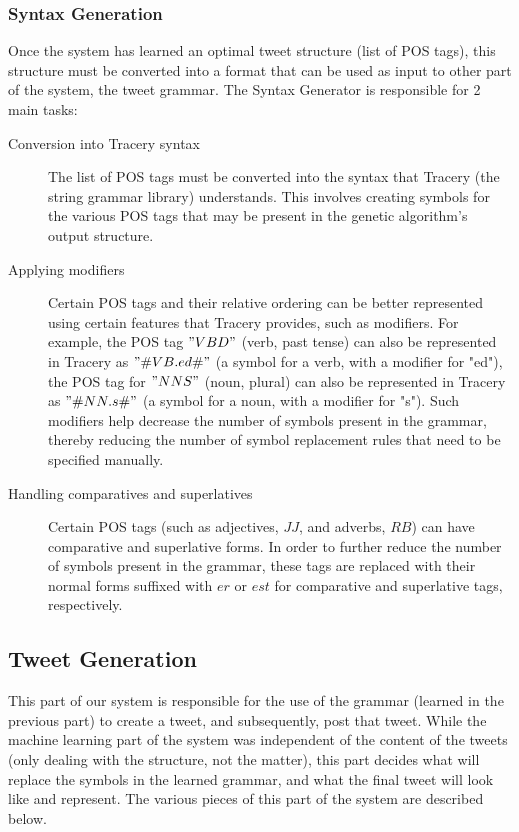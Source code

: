 \subsubsection{Syntax Generation}
Once the system has learned an optimal tweet structure (list of POS tags), this structure must be converted into a format that can be used as input to other part of the system, the tweet grammar. The Syntax Generator is responsible for 2 main tasks:
\begin{description}
\item [Conversion into Tracery syntax]
The list of POS tags must be converted into the syntax that Tracery (the string grammar library) understands. This involves creating symbols for the various POS tags that may be present in the genetic algorithm's output structure.
\item [Applying modifiers]
Certain POS tags and their relative ordering can be better represented using certain features that Tracery provides, such as modifiers. For example, the POS tag $"VBD"$ (verb, past tense) can also be represented in Tracery as $"\#VB.ed\#"$ (a symbol for a verb, with a modifier for "ed"), the POS tag for $"NNS"$ (noun, plural) can also be represented in Tracery as $"\#NN.s\#"$ (a symbol for a noun, with a modifier for "s"). Such modifiers help decrease the number of symbols present in the grammar, thereby reducing the number of symbol replacement rules that need to be specified manually.
\item [Handling comparatives and superlatives]
Certain POS tags (such as adjectives, $JJ$, and adverbs, $RB$) can have comparative and superlative forms. In order to further reduce the number of symbols present in the grammar, these tags are replaced with their normal forms suffixed with $er$ or $est$ for comparative and superlative tags, respectively.
\end{description}
\subsection{Tweet Generation}
This part of our system is responsible for the use of the grammar (learned in the previous part) to create a tweet, and subsequently, post that tweet. While the machine learning part of the system was independent of the content of the tweets (only dealing with the structure, not the matter), this part decides what will replace the symbols in the learned grammar, and what the final tweet will look like and represent. The various pieces of this part of the system are described below.
